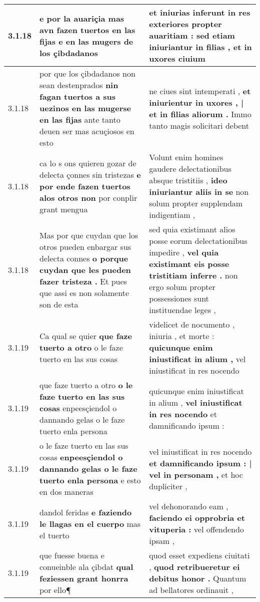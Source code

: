 \begin{tabular}{|p{1cm}|p{6.5cm}|p{6.5cm}|}
3.1.18 & e por la auariçia \textbf{ mas avn fazen tuertos en las fijas } e en las mugers de los çibdadanos & et iniurias inferunt in res exteriores propter auaritiam : \textbf{ sed etiam iniuriantur in filias , } et in uxores ciuium \\\hline
3.1.18 & por que los çibdadanos non sean destenprados \textbf{ nin fagan tuertos a sus uezinos en las mugerse en las fijas } ante tanto deuen ser mas acuçiosos en esto & ne ciues sint intemperati , \textbf{ et iniurientur in uxores , | et in filias aliorum . } Immo tanto magis solicitari debent \\\hline
3.1.18 & ca lo s ons quieren gozar de delecta çonnes sin tristezas \textbf{ e por ende fazen tuertos alos otros non } por conplir grant mengua & Volunt enim homines gaudere delectationibus absque tristitiis , \textbf{ ideo iniuriantur aliis in se } non solum propter supplendam indigentiam , \\\hline
3.1.18 & Mas por que cuydan que los otros pueden enbargar sus delecta connes \textbf{ o porque cuydan que les pueden fazer tristeza . } Et pues que assi es non solamente son de esta & sed quia existimant alios posse eorum delectationibus impedire , \textbf{ vel quia existimant eis posse tristitiam inferre . } non ergo solum propter possessiones sunt instituendae leges , \\\hline
3.1.19 & Ca qual se quier \textbf{ que faze tuerto a otro } o le faze tuerto en las sus cosas & videlicet de nocumento , iniuria , et morte : \textbf{ quicunque enim iniustificat in alium , } vel iniustificat in res nocendo \\\hline
3.1.19 & que faze tuerto a otro \textbf{ o le faze tuerto en las sus cosas } enpeesçiendol o dannando gelas o le faze tuerto enla persona & quicunque enim iniustificat in alium , \textbf{ vel iniustificat in res nocendo } et damnificando ipsum : \\\hline
3.1.19 & o le faze tuerto en las sus cosas \textbf{ enpeesçiendol o dannando gelas o le faze tuerto enla persona } e esto en dos maneras & vel iniustificat in res nocendo \textbf{ et damnificando ipsum : | vel in personam , } et hoc dupliciter , \\\hline
3.1.19 & dandol feridas \textbf{ e faziendo le llagas en el cuerpo } mas el tuerto & vel dehonorando eam , \textbf{ faciendo ei opprobria et vituperia : } vel offendendo ipsam , \\\hline
3.1.19 & que fuesse buena e conueinble ala çibdat \textbf{ qual feziessen grant honrra } por ello¶ & quod esset expediens ciuitati , \textbf{ quod retribueretur ei debitus honor . } Quantum ad bellatores ordinauit , \\\hline

\end{tabular}
